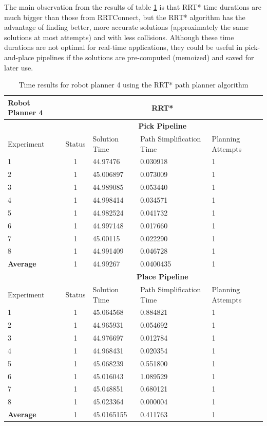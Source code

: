 The main observation from the results of table \ref{robot-planner4-rrtstar-data} is that RRT* time durations are much bigger than those from RRTConnect, but the RRT* algorithm has the advantage of finding better, more accurate solutions (approximately the same solutions at most attempts) and with less collisions. Although these time durations are not optimal for real-time applications, they could be useful in pick-and-place pipelines 
if the solutions are pre-computed (memoized) and saved for later use.

\begin{table}[H]
\centering
\begin{tabular}{|p{2cm}|c|p{3cm}|p{3cm}|p{3cm}|}
\hline
Robot Planner 4           & \multicolumn{4}{c}{\textbf{RRT*}}                                                                                                 \vline \\
\hline
                          & \multicolumn{4}{c}{\textbf{Pick Pipeline}}                     \vline \\
\hline
Experiment                & Status & Solution Time & Path Simplification Time & Planning Attempts  \\
\hline
1	& 1 & 44.97476	& 0.030918	& 1	\\
2	& 1 & 45.006897	& 0.073009	& 1	\\
3	& 1	& 44.989085	& 0.053440	& 1	\\
4	& 1 & 44.998414	& 0.034571	& 1	\\
5	& 1 & 44.982524	& 0.041732	& 1	\\
6	& 1 & 44.997148	& 0.017660	& 1	\\
7	& 1 & 45.00115	& 0.022290	& 1	\\
8	& 1 & 44.991409	& 0.046728	& 1	\\
\hline
\textbf{Average} & 1 & 44.99267	& 0.0400435	& 1	\\
\hline
                          & \multicolumn{4}{c}{\textbf{Place Pipeline}}                     \vline \\
\hline
Experiment                & Status & Solution Time & Path Simplification Time & Planning Attempts  \\
\hline
1	& 1	& 45.064568	& 0.884821	& 1 \\
2	& 1	& 44.965931	& 0.054692	& 1 \\
3	& 1	& 44.976697	& 0.012784	& 1 \\
4	& 1	& 44.968431	& 0.020354	& 1 \\
5	& 1	& 45.068239	& 0.551800	& 1 \\
6	& 1	& 45.016043	& 1.089529	& 1 \\
7	& 1	& 45.048851	& 0.680121	& 1 \\
8	& 1	& 45.023364	& 0.000004	& 1 \\
\hline
\textbf{Average} & 1	& 45.0165155	& 0.411763	& 1 \\
\hline
\end{tabular}
\caption{Time results for robot planner 4 using the RRT* path planner algorithm}
\label{robot-planner4-rrtstar-data}
\end{table}


